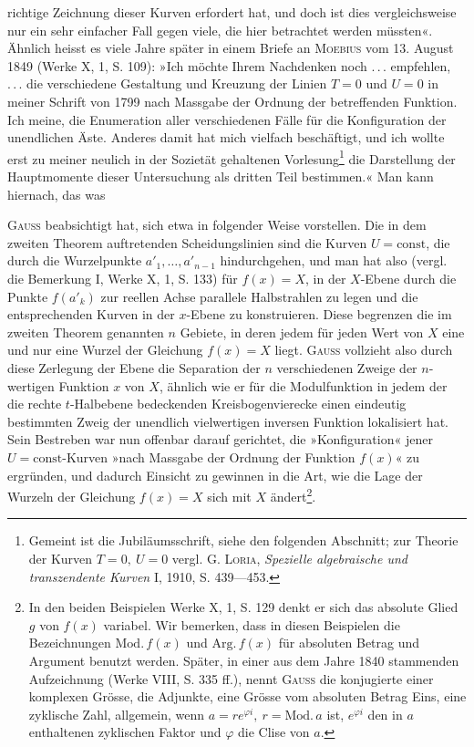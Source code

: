 richtige Zeichnung dieser Kurven erfordert hat, und doch ist dies vergleichsweise
nur ein sehr einfacher Fall gegen viele, die hier betrachtet werden
müssten«. Ähnlich heisst es viele Jahre später in einem Briefe an \textsc{Moebius}
vom 13. August 1849 (Werke X, 1, S. 109): »Ich möchte Ihrem Nachdenken
noch \mbox{.\,.\,.} empfehlen, \mbox{.\,.\,.} die verschiedene Gestaltung und Kreuzung der Linien
\(T=0\) und \(U=0\) in meiner Schrift von 1799 nach Massgabe der Ordnung
der betreffenden Funktion. Ich meine, die Enumeration aller verschiedenen
Fälle für die Konfiguration der unendlichen Äste. Anderes damit 
hat mich vielfach beschäftigt, und ich wollte erst zu meiner neulich in der
Sozietät gehaltenen Vorlesung\footnote{Gemeint ist die Jubiläumsschrift, siehe den folgenden Abschnitt; zur Theorie der Kurven \(T=0,\ U=0\) vergl. G. \textsc{Loria}, \textit{Spezielle algebraische und transzendente Kurven} I, 1910, S. 439—453.} die Darstellung der Hauptmomente dieser
Untersuchung als dritten Teil bestimmen.« Man kann hiernach, das was
\par\clearpage{}
\noindent \textsc{Gauss} beabsichtigt hat, sich etwa in folgender Weise vorstellen. Die in dem
zweiten Theorem auftretenden Scheidungslinien sind die Kurven \(U=\mathrm{const}\),
die durch die Wurzelpunkte \(a'_1,\ldots,a'_{n-1}\) hindurchgehen, und man hat also
(vergl. die Bemerkung I, Werke X, 1, S. 133) für \(f(x)=X\), in der \(X\)-Ebene
durch die Punkte \(f(a'_k)\) zur reellen Achse parallele Halbstrahlen zu legen und
die entsprechenden Kurven in der \(x\)-Ebene zu konstruieren. Diese begrenzen
die im zweiten Theorem genannten \(n\) Gebiete, in deren jedem für jeden Wert
von \(X\) eine und nur eine Wurzel der Gleichung \(f(x)=X\) liegt. \textsc{Gauss} vollzieht
also durch diese Zerlegung der Ebene die Separation der \(n\) verschiedenen
Zweige der \(n\)-wertigen Funktion \(x\) von \(X\), ähnlich wie er für die
Modulfunktion in jedem der die rechte \(t\)-Halbebene bedeckenden Kreisbogenvierecke
einen eindeutig bestimmten Zweig der unendlich vielwertigen inversen
Funktion lokalisiert hat. Sein Bestreben war nun offenbar darauf gerichtet,
die »Konfiguration« jener \(U=\mathrm{const}\)-Kurven »nach Massgabe der Ordnung
der Funktion \(f(x)\)« zu ergründen, und dadurch Einsicht zu gewinnen in die
Art, wie die Lage der Wurzeln der Gleichung \(f(x)=X\) sich mit \(X\) ändert\footnote{In den beiden Beispielen Werke X, 1, S. 129 denkt er sich das absolute Glied \(g\) von \(f(x)\) variabel. Wir bemerken, dass in diesen Beispielen die Bezeichnungen \(\mathrm{Mod.}\,f(x)\) und \(\mathrm{Arg.}\,f(x)\) für absoluten Betrag und Argument benutzt werden. Später, in einer aus dem Jahre 1840 stammenden Aufzeichnung (Werke VIII, S. 335 ff.), nennt \textsc{Gauss} die konjugierte einer komplexen Grösse, die Adjunkte, eine Grösse vom absoluten Betrag Eins, eine zyklische Zahl, allgemein, wenn \(a=re^{\varphi i},\ r=\mathrm{Mod.}\,a\) ist, \(e^{\varphi i}\) den in \(a\) enthaltenen zyklischen Faktor und \(\varphi\) die Clise von \(a\).}.
